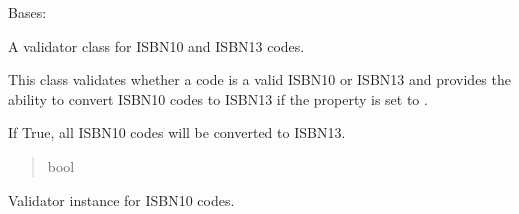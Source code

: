 \documentclass[letterpaper,10pt,english]{sphinxmanual}
\begin{document}
\begin{fulllineitems}
\label{\detokenize{apache_commons_validator_python.routines:apache_commons_validator_python.routines.isbn_validator.ISBNValidator}}
\pysigstartsignatures
{}
\pysigstopsignatures
\sphinxAtStartPar
Bases: 

\sphinxAtStartPar
A validator class for ISBN\sphinxhyphen{}10 and ISBN\sphinxhyphen{}13 codes.

\sphinxAtStartPar
This class validates whether a code is a valid ISBN\sphinxhyphen{}10 or ISBN\sphinxhyphen{}13 and provides the ability
to convert ISBN\sphinxhyphen{}10 codes to ISBN\sphinxhyphen{}13 if the  property is set to .

\begin{fulllineitems}
\label{\detokenize{apache_commons_validator_python.routines:apache_commons_validator_python.routines.isbn_validator.ISBNValidator.convert}}
\pysigstartsignatures
{}
\pysigstopsignatures
\sphinxAtStartPar
If True, all ISBN\sphinxhyphen{}10 codes will be converted to ISBN\sphinxhyphen{}13.
\begin{quote}\begin{description}
\sphinxAtStartPar
bool

\end{description}\end{quote}

\end{fulllineitems}


\begin{fulllineitems}
\label{\detokenize{apache_commons_validator_python.routines:apache_commons_validator_python.routines.isbn_validator.ISBNValidator.isbn10_validator}}
\pysigstartsignatures
{}
\pysigstopsignatures
\sphinxAtStartPar
Validator instance for ISBN\sphinxhyphen{}10 codes.
\begin{quote}\begin{description}
\sphinxAtStartPar
{\hyperref[\detokenize{apache_commons_validator_python.routines:apache_commons_validator_python.routines.code_validator.CodeValidator}]{}}


\end{description}
\end{quote}
\end{fulllineitems}
\end{fulllineitems}
\end{document}
